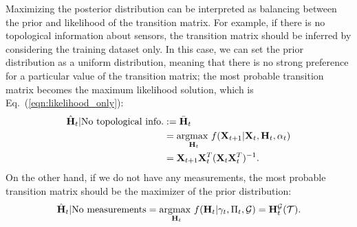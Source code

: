 \documentclass[journal]{IEEEtran}
\begin{document}
Maximizing the posterior distribution can be interpreted as balancing between the prior and likelihood of the transition matrix.
For example, if there is no topological information about sensors, the transition matrix should be inferred by considering the training dataset only. 
In this case, we can set the prior distribution as a uniform distribution, meaning that there is no strong preference for a particular value of the transition matrix; the most probable transition matrix becomes the maximum likelihood solution, which is Eq.~(\ref{eqn:likelihood_only}):
\begin{equation}
\begin{aligned}
    \hat{\bf{H}}_t|{\text{No topological info.}}&:=\bar{\bf{H}}_t\\
    &=\underset{{\bf{H}}_t}{\text{argmax }}f({\bf{X}}_{t+1}|{\bf{X}}_{t},{\bf{H}}_{t},\alpha_t)\\
    &={\bf{X}}_{t+1}{\bf{X}}_t^T({\bf{X}}_{t}{\bf{X}}_t^T)^{-1}.
\end{aligned}
\end{equation}
On the other hand, if we do not have any measurements, the most probable transition matrix should be the maximizer of the prior distribution:
\begin{equation}\label{eqn:prior_only}
    \hat{\bf{H}}_t|{\text{No measurements}}=\underset{{\bf{H}}_t}{\text{argmax }}f({\bf{H}}_t|\gamma_t,\Pi_t,\mathcal{G})={\bf{H}}_t^{\mathcal{G}}(\mathcal{T}).
\end{equation}
\end{document}
